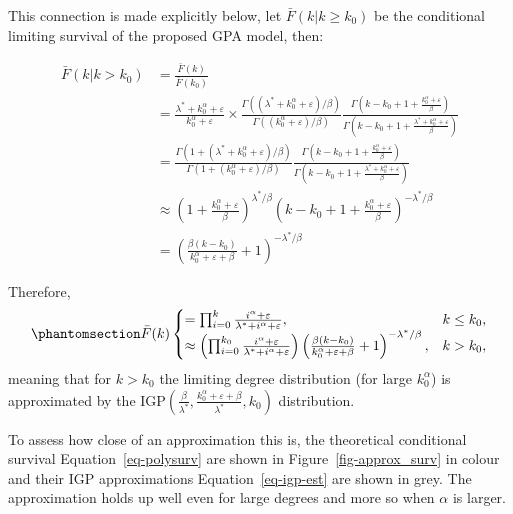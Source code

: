 \documentclass[
  sn-basic,
  10pt,
]{sn-jnl}
\theoremstyle{thmstyleone}
\theoremstyle{thmstyleone}
\theoremstyle{remark}
\theoremstyle{plain}
\theoremstyle{plain}
\theoremstyle{remark}
\begin{document}
This connection is made explicitly below, let \(\bar F (k|k\ge k_0)\) be
the conditional limiting survival of the proposed GPA model, then:

\begin{align*}
\bar F(k|k>k_0) &= \frac{\bar F(k)}{\bar F(k_0)}\\
&= \frac{\lambda^* + k_0^\alpha + \varepsilon}{k_0^\alpha + \varepsilon}\times \frac{\Gamma((\lambda^*+k_0^\alpha + \varepsilon)/\beta)}{\Gamma\left((k_0^\alpha + \varepsilon)/\beta\right)} \frac{\Gamma\left(k-k_0 + 1 +\frac{k_0^\alpha + \varepsilon}{\beta}\right)}{\Gamma\left(k-k_0 + 1 +\frac{\lambda^* +k_0^\alpha + \varepsilon}{\beta}\right)}\\
&=\frac{\Gamma(1 + (\lambda^*+k_0^\alpha + \varepsilon)/\beta)}{\Gamma\left(1+(k_0^\alpha + \varepsilon)/\beta\right)} \frac{\Gamma\left(k-k_0 + 1 +\frac{k_0^\alpha + \varepsilon}{\beta}\right)}{\Gamma\left(k-k_0 + 1 +\frac{\lambda^* +k_0^\alpha + \varepsilon}{\beta}\right)}\\
&\approx \left(1+\frac{k_0^\alpha + \varepsilon}{\beta}\right)^{\lambda^*/\beta} \left(k-k_0+1+\frac{k_0^\alpha + \varepsilon}{\beta}\right)^{-\lambda^*/\beta}\\
&=\left(\frac{\beta(k-k_0)}{k_0^{\alpha}+\varepsilon+\beta} + 1\right)^{-\lambda^{*}/\beta}
\end{align*}

Therefore, \begin{equation}\phantomsection\label{eq-igp-est}{
\bar F(k) 
\begin{cases}
=\prod_{i=0}^{k}\frac{i^\alpha + \varepsilon}{\lambda^*+i^\alpha + \varepsilon},&k\le k_0,\\
\approx \left(\prod_{i=0}^{k_0}\frac{i^\alpha + \varepsilon}{\lambda^* + i^\alpha + \varepsilon}\right)\left(\frac{\beta(k-k_0)}{k_0^{\alpha}+\varepsilon+\beta} + 1\right)^{-\lambda^{*}/\beta},&k > k_0,
\end{cases}
}\end{equation} meaning that for \(k> k_0\) the limiting degree
distribution (for large \(k_0^\alpha\)) is approximated by the
\(\text{IGP}\left(\frac{\beta}{\lambda^*}, \frac{k_0^\alpha + \varepsilon+\beta}{\lambda^*},k_0\right)\)
distribution.

To assess how close of an approximation this is, the theoretical
conditional survival Equation~\ref{eq-polysurv} are shown in
Figure~\ref{fig-approx_surv} in colour and their IGP approximations
Equation~\ref{eq-igp-est} are shown in grey. The approximation holds up
well even for large degrees and more so when \(\alpha\) is larger.
\end{document}
